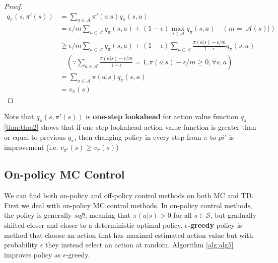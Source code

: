 \documentclass[
	10pt, %
]{article}
\theoremstyle{plain}
\newcommand{\mc}[1]{\mathcal{#1}}
\newcommand{\tb}[1]{\textbf{#1}}
\newcommand{\ti}[1]{\textit{#1}}
\numberwithin{equation}{subsection} %
\begin{document}
\begin{proof}
\begin{equation} \label{eq:eq39}
    \begin{aligned}
        q_\pi(s, \pi'(s))
        &= \sum_{a \in \mc{A}} \pi'(a|s)q_\pi(s,a) \\
        &= \epsilon/m \sum_{a \in \mc{A}} q_\pi(s,a) + (1-\epsilon) \max_{a \in \mc{A}}q_\pi(s,a) \quad (m=|\mc{A}(s)|) \\
        &\geq \epsilon / m \sum_{a \in \mc{A}}q_\pi(s,a) + (1-\epsilon)\sum_{a \in \mc{A}}\frac{\pi(a|s) - \epsilon / m}{1 - \epsilon}q_\pi(s,a)\\ 
        &\quad \left(\because \sum_{a \in \mc{A}}\frac{\pi(a|s) - \epsilon /m}{1-\epsilon} =1, \pi(a|s) - \epsilon/m \geq 0, \forall s,a \right)\\
        &= \sum_{a \in \mc{A}}\pi(a|s)q_\pi(s,a) \\
        &= v_\pi(s)
    \end{aligned}
\end{equation}
\end{proof}

Note that $q_\pi(s, \pi'(s))$ is \tb{one-step lookahead} for action value function $q_\pi$. 
\cref{thm:thm2} shows that if one-step lookahead action value function is greater than or equal to previous $q_\pi$, then changing policy in every step from $\pi$ to $pi'$ is improvement (i.e. $v_{\pi'}(s) \geq v_\pi(s)$)
\subsection{On-policy MC Control}
We can find both on-policy and off-policy control methods on both MC and TD. First we deal with on-policy MC control methods.
In on-policy control methods, the policy is generally \ti{soft}, meaning that $\pi(a|s) > 0$ for all $s \in \mc{S}$, but gradually shifted closer and closer to a deterministic optimal policy. 
\tb{$\epsilon$-greedy} policy is method that choose an action that has maximal estimated action value but with probability $\epsilon$ they instead select an action at random. 
Algorithm \cref{alg:alg5} improves policy as $\epsilon$-greedy.
\end{document}
